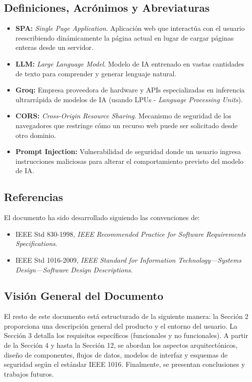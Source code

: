 \subsection{Definiciones, Acrónimos y Abreviaturas}
\begin{itemize}
    \item \textbf{SPA:} \textit{Single Page Application}. Aplicación web que interactúa con el usuario reescribiendo dinámicamente la página actual en lugar de cargar páginas enteras desde un servidor.
    \item \textbf{LLM:} \textit{Large Language Model}. Modelo de IA entrenado en vastas cantidades de texto para comprender y generar lenguaje natural.
    \item \textbf{Groq:} Empresa proveedora de hardware y APIs especializadas en inferencia ultrarrápida de modelos de IA (usando LPUs - \textit{Language Processing Units}).
    \item \textbf{CORS:} \textit{Cross-Origin Resource Sharing}. Mecanismo de seguridad de los navegadores que restringe cómo un recurso web puede ser solicitado desde otro dominio.
    \item \textbf{Prompt Injection:} Vulnerabilidad de seguridad donde un usuario ingresa instrucciones maliciosas para alterar el comportamiento previsto del modelo de IA.
\end{itemize}

\subsection{Referencias}
El documento ha sido desarrollado siguiendo las convenciones de:
\begin{itemize}
    \item IEEE Std 830-1998, \textit{IEEE Recommended Practice for Software Requirements Specifications}.
    \item IEEE Std 1016-2009, \textit{IEEE Standard for Information Technology—Systems Design—Software Design Descriptions}.
\end{itemize}

\subsection{Visión General del Documento}
El resto de este documento está estructurado de la siguiente manera: la Sección 2 proporciona una descripción general del producto y el entorno del usuario. La Sección 3 detalla los requisitos específicos (funcionales y no funcionales). A partir de la Sección 4 y hasta la Sección 12, se abordan los aspectos arquitectónicos, diseño de componentes, flujos de datos, modelos de interfaz y esquemas de seguridad según el estándar IEEE 1016. Finalmente, se presentan conclusiones y trabajos futuros.
